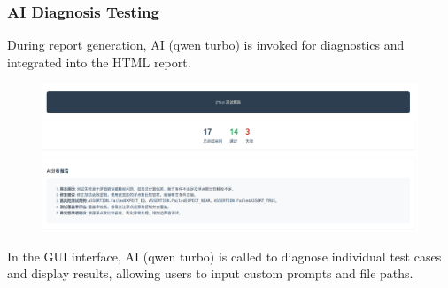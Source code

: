 \documentclass{article}
\begin{document}
\subsubsection{AI Diagnosis Testing}
During report generation, AI (qwen turbo) is invoked for diagnostics and integrated into the HTML report.
\begin{figure}[H]
    \centering
    \includegraphics[width=\textwidth]{img/ai.png}
\end{figure}
In the GUI interface, AI (qwen turbo) is called to diagnose individual test cases and display results, allowing users to input custom prompts and file paths.
\end{document}

